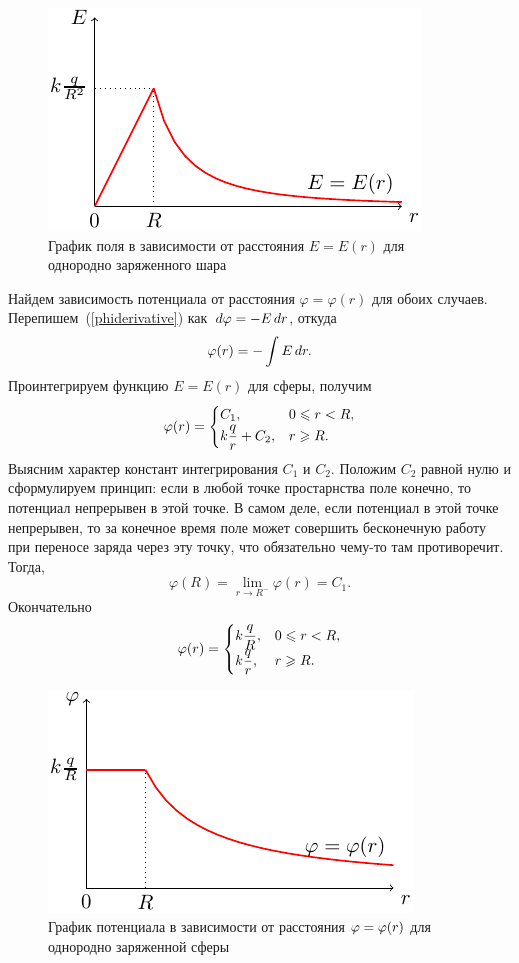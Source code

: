 	\begin{figure}[t]
		\centering
		\includegraphics[scale=2]{./img/plot2/plot2.pdf}
		\caption{График поля в зависимости от расстояния $E=E(r)$ для однородно заряженного шара}
	\end{figure}
	Найдем зависимость потенциала от расстояния $\varphi=\varphi(r)$ для обоих случаев. Перепишем~(\ref{phiderivative}) как $\,d \varphi=-E\,d r$, откуда
	\begin{equation}
		\varphi(r)=-\int E\,d r.
	\end{equation}
	Проинтегрируем функцию $E=E(r)$ для сферы, получим
	\begin{equation}
		\varphi(r)=\begin{cases}
						C_1,& \text{$0\leqslant r<R$},\\
						k\dfrac{q}{r} + C_2,& \text{$r\geqslant R$}.
					\end{cases}
	\end{equation}
	Выясним характер констант интегрирования $C_1$ и $C_2$. Положим $C_2$ равной нулю и сформулируем принцип: если в любой точке простарнства поле конечно, то потенциал непрерывен в этой точке. В самом деле, если потенциал в этой точке непрерывен, то за конечное время поле может совершить бесконечную работу при переносе заряда через эту точку, что обязательно чему-то там противоречит. Тогда,
		$$\varphi(R)=\lim_{r\rightarrow R^-} \varphi(r)=C_1.$$
	Окончательно
	\begin{equation}
		\varphi(r)=\begin{cases}
						k\dfrac{q}{R},& \text{$0\leqslant r<R$},\\
						k\dfrac{q}{r},& \text{$r\geqslant R$}.
					\end{cases}
	\end{equation}
	\begin{figure}[t]
		\centering
		\includegraphics[scale=2]{./img/plot3/plot3.pdf}
		\caption{График потенциала в зависимости от расстояния $\varphi\hm{=}\varphi(r)$ для однородно заряженной сферы}
	\end{figure}
